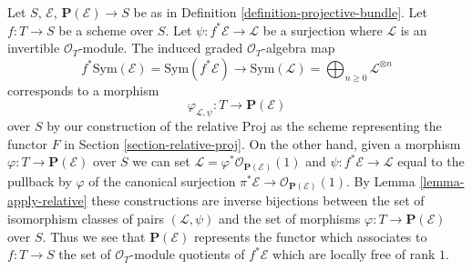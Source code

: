 \medskip\noindent
Let $S$, $\mathcal{E}$, $\mathbf{P}(\mathcal{E}) \to S$ be as in
Definition \ref{definition-projective-bundle}. Let $f : T \to S$
be a scheme over $S$. Let $\psi : f^*\mathcal{E} \to \mathcal{L}$
be a surjection where $\mathcal{L}$ is an invertible $\mathcal{O}_T$-module.
The induced graded $\mathcal{O}_T$-algebra map
$$
f^*\text{Sym}(\mathcal{E}) = \text{Sym}(f^*\mathcal{E}) \to
\text{Sym}(\mathcal{L}) = \bigoplus\nolimits_{n \geq 0} \mathcal{L}^{\otimes n}
$$
corresponds to a morphism
$$
\varphi_{\mathcal{L}, \psi} : T \longrightarrow \mathbf{P}(\mathcal{E})
$$
over $S$ by our construction of the relative Proj as the scheme representing
the functor $F$ in Section \ref{section-relative-proj}. On the other hand,
given a morphism $\varphi : T \to \mathbf{P}(\mathcal{E})$ over $S$
we can set $\mathcal{L} = \varphi^*\mathcal{O}_{\mathbf{P}(\mathcal{E})}(1)$
and $\psi : f^*\mathcal{E} \to \mathcal{L}$ equal to the pullback
by $\varphi$ of the canonical surjection
$\pi^*\mathcal{E} \to \mathcal{O}_{\mathbf{P}(\mathcal{E})}(1)$.
By Lemma \ref{lemma-apply-relative} these constructions
are inverse bijections between the set of isomorphism classes of pairs
$(\mathcal{L}, \psi)$ and the set of morphisms
$\varphi : T \to \mathbf{P}(\mathcal{E})$ over $S$.
Thus we see that $\mathbf{P}(\mathcal{E})$ represents the functor
which associates to $f : T \to S$ the set of $\mathcal{O}_T$-module
quotients of $f^*\mathcal{E}$ which are locally free of rank $1$.

